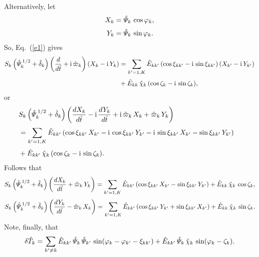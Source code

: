 \documentclass[12pt]{article}
\begin{document}
Alternatively, let
\begin{align}
X_k &= \hat{\mit\Psi}_k\,\cos\varphi_k,\\[0.5ex]
Y_k &= \hat{\mit\Psi}_k\,\sin\varphi_k.
\end{align}
So, Eq.~(\ref{e1}) gives
\begin{align}
S_k\left(\hat{\mit\Psi}_k^{\,1/2} +\hat{\delta}_k\right)\left(\frac{d}{d\hat{t}} + {\rm i}\,\hat{\varpi}_k\right)(X_k - {\rm i}\,Y_k)&=
\sum_{k'=1,K}\hat{E}_{kk'}\,(\cos\xi_{kk'} - {\rm i}\,\sin\xi_{kk'})\,(X_{k'} - {\rm i}\,Y_{k'})\nonumber\\[0.5ex]
&
+ \hat{E}_{kk}\,\hat{\chi}_k\,(\cos\zeta_k - {\rm i }\,\sin\zeta_k),
\end{align}
or
\begin{align}
&S_k\left(\hat{\mit\Psi}_k^{\,1/2} +\hat{\delta}_k\right)\left(\frac{dX_k}{d\hat{t}} - {\rm i}\,\frac{dY_k}{d\hat{t}} + {\rm i}\,\hat{\varpi}_k\,X_k
+\hat{\varpi}_k\,Y_k\right)&\nonumber\\[0.5ex]
&= \sum_{k'=1,K}\hat{E}_{kk'}\,(\cos\xi_{kk'}\,X_{k'} -{\rm i}\,\cos\xi_{kk'}\,Y_{k'}
-{\rm i}\,\sin\xi_{kk'}\,X_{k'} -\sin\xi_{kk'}\,Y_{k'})\nonumber\\[0.5ex]
& + \hat{E}_{kk'}\,\hat{\chi}_k\,(\cos\zeta_k - {\rm i}\,\sin\zeta_k).
\end{align}
Follows that
\begin{align}
S_k\left(\hat{\mit\Psi}_k^{\,1/2} +\hat{\delta}_k\right)\left(\frac{dX_k}{d\hat{t}} 
+\hat{\varpi}_k\,Y_k\right)= \sum_{k'=1,K}\hat{E}_{kk'}\,(\cos\xi_{kk'}\,X_{k'}  -\sin\xi_{kk'}\,Y_{k'}) + \hat{E}_{kk}\,\hat{\chi}_k\,\cos\zeta_k,\\[0.5ex]
S_k\left(\hat{\mit\Psi}_k^{\,1/2} +\hat{\delta}_k\right)\left(\frac{dY_k}{d\hat{t}} -\hat{\varpi}_k\,X_k\right)
= \sum_{k'=1,K}\hat{E}_{kk'}\,(\cos\xi_{kk'}\,Y_{k'}
+\sin\xi_{kk'}\,X_{k'}) + \hat{E}_{kk}\,\hat{\chi}_k\,\sin\zeta_k.
\end{align}
Note, finally, that
\begin{equation}
\delta \hat{T}_k = \sum_{k'\neq k} \hat{E}_{kk'}\,\hat{\mit\Psi}_k\,\hat{\mit\Psi}_{k'}\,\sin(\varphi_k-\varphi_{k'}-\xi_{kk'}) + \hat{E}_{kk'}\,\hat{\mit\Psi}_k\,\hat{\chi}_k\,\sin(\varphi_k-\zeta_k).
\end{equation}
\end{document}
